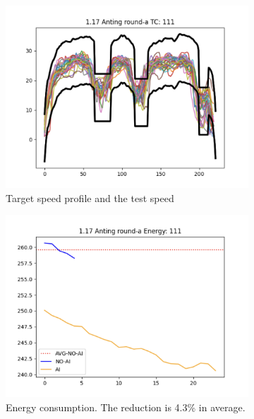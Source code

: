 \documentclass{article}
\begin{document}
\begin{figure}[htbp]
	\centering
	\begin{subfigure}[t]{0.3\textwidth}
		\centering
		\includegraphics[width=\textwidth]{images/openroad_mm_111_velocity.png}
		\caption{Target speed profile and the test speed}\label{fig:openroad mm 111 velocity}
	\end{subfigure}
	\hfill
	\begin{subfigure}[t]{0.3\textwidth}
		\centering
		\includegraphics[width=\textwidth]{images/openroad_mm_111_consumption.png}
		\caption{Energy consumption. The reduction is 4.3\% in average.}\label{fig:openroad mm 111 consumption}
	\end{subfigure}
	\hfill
	\begin{subfigure}[t]{0.3\textwidth}

\end{subfigure}
\end{figure}
\end{document}
